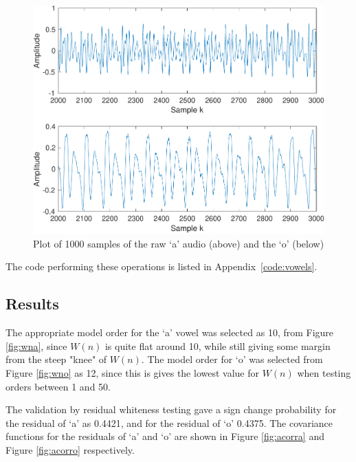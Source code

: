 \documentclass{IEEEtran}
\begin{document}
\begin{figure}[h!]
    \centering
    \captionsetup{justification=centering}
    \includegraphics[width=0.8\columnwidth]{pictures/raw_o_audio.pdf}
    \caption{Plot of 1000 samples of the raw `a' audio (above) and the `o'
    (below)}
    \label{fig:rawaudio}
\end{figure}

The code performing these operations is listed in Appendix~\ref{code:vowels}.

\subsection{Results}

The appropriate model order for the `a' vowel was selected as 10, from Figure
\ref{fig:wna}, since $W(n)$ is quite flat around 10, while still giving some
margin from the steep "knee" of $W(n)$. The model order for `o' was selected
from Figure \ref{fig:wno} as 12, since this is gives the lowest value for $W(n)$
when testing orders between 1 and 50.

The validation by residual whiteness testing gave a sign change probability for
the residual of `a' as 0.4421, and for the residual of `o' 0.4375. The
covariance functions for the
residuals of `a' and `o' are shown in Figure \ref{fig:acorra} and Figure
\ref{fig:acorro} respectively.
\end{document}
